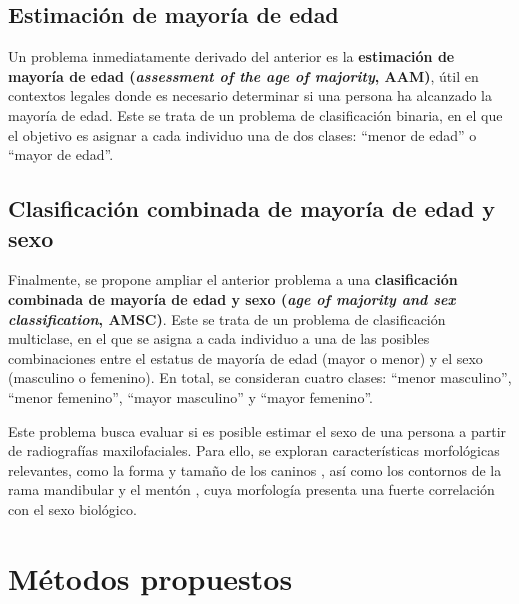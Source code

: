 
\subsection{Estimación de mayoría de edad}

Un problema inmediatamente derivado del anterior es la 
\textbf{estimación de mayoría de edad (\textit{assessment of the age of majority}, AAM)}, útil 
en contextos legales donde es necesario determinar si una persona ha alcanzado la mayoría de edad.
Este se trata de un problema de clasificación binaria, en el que el objetivo es asignar a cada individuo una 
de dos clases: ``menor de edad'' o ``mayor de edad''.


\subsection{Clasificación combinada de mayoría de edad y sexo}

Finalmente, se propone ampliar el anterior problema a una \textbf{clasificación combinada de mayoría de edad 
y sexo (\textit{age of majority and sex classification}, AMSC)}.
Este se trata de un problema de clasificación multiclase, en el que se asigna a cada individuo a una de las 
posibles combinaciones entre el estatus de mayoría de edad (mayor o menor) y el sexo (masculino o femenino).
En total, se consideran cuatro clases: ``menor masculino'', ``menor femenino'', ``mayor masculino'' y 
``mayor femenino''.

Este problema busca evaluar si es posible estimar el sexo de una persona a partir de radiografías 
maxilofaciales. Para ello, se exploran características morfológicas relevantes, como la forma y tamaño de 
los caninos \cite{rao1989}, así como los contornos de la rama mandibular y el mentón \cite{indira2012}, cuya 
morfología presenta una fuerte correlación con el sexo biológico.


\section{Métodos propuestos}

